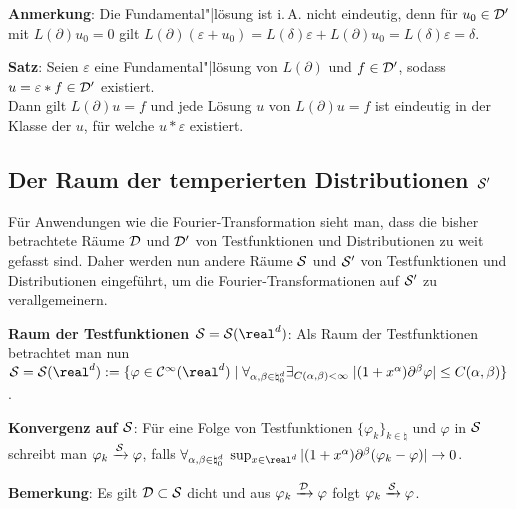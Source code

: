 \textbf{Anmerkung}:
Die Fundamental"|lösung ist i.\,A. nicht eindeutig, denn für
$u_0 \in \D'$ mit $L(\partial) u_0 = 0$ gilt
$L(\partial)(\varepsilon + u_0) = L(\delta)\varepsilon + L(\partial)u_0 =
L(\delta)\varepsilon = \delta$.

\textbf{Satz}:
Seien $\varepsilon$ eine Fundamental"|lösung von $L(\partial)$ und
$f \in \D'$, sodass $u = \varepsilon \ast f \in \D'$ existiert.\\
Dann gilt $L(\partial)u = f$ und jede Lösung $u$ von $L(\partial)u = f$
ist eindeutig in der Klasse der $u$, für welche $u \ast \varepsilon$ existiert.

\pagebreak

\subsection{%
    Der Raum der temperierten Distributionen \texorpdfstring{$\S'$}{S'}%
}

Für Anwendungen wie die Fourier-Transformation sieht man, dass die bisher
betrachtete Räume $\D$ und $\D'$ von Testfunktionen und Distributionen
zu weit gefasst sind.
Daher werden nun andere Räume $\S$ und $\S'$ von Testfunktionen und
Distributionen eingeführt, um die Fourier-Transformationen auf $\S'$
zu verallgemeinern.

\textbf{Raum der Testfunktionen $\S = \S(\real^d)$}:
Als Raum der Testfunktionen betrachtet man nun\\
$\S = \S(\real^d) := \{\varphi \in \C^\infty(\real^d) \;|\;
\forall_{\alpha, \beta \in \natural_0^d} \exists_{C(\alpha, \beta) < \infty}\;
|(1 + x^\alpha)\partial^\beta \varphi| \le C(\alpha, \beta)\}$.

\textbf{Konvergenz auf $\S$}:
Für eine Folge von Testfunktionen $\{\varphi_k\}_{k \in \natural}$ und
$\varphi$ in $\S$ schreibt man $\varphi_k \xrightarrow{\S} \varphi$, falls
$\forall_{\alpha, \beta \in \natural_0^d}\;
\sup_{x \in \real^d} |(1 + x^\alpha) \partial^\beta (\varphi_k - \varphi)|
\to 0$.

\textbf{Bemerkung}:
Es gilt $\D \subset \S$ dicht und aus
$\varphi_k \xrightarrow{\D} \varphi$ folgt
$\varphi_k \xrightarrow{\S} \varphi$.

